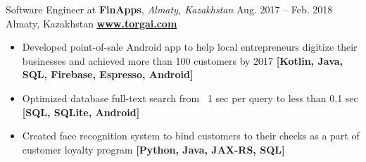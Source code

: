 \cveventflat
{Software Engineer at }
{\textbf{FinApps}, \textit{Almaty, Kazakhstan}}
{Aug. 2017 -- Feb. 2018}
{Almaty, Kazakhstan}
\newline
\href{https://torgai.com/}{\textbf{www.torgai.com}}
\begin{itemize}
    \item Developed point-of-sale Android app to help local entrepreneurs digitize their businesses and achieved more than 100 customers by 2017
    \textbf{[Kotlin, Java, SQL, Firebase, Espresso, Android]}
    \item Optimized database full-text search from ~1 sec per query to less than 0.1 sec
    \textbf{[SQL, SQLite, Android]}
    \item Created face recognition system to bind customers to their checks as a part of customer loyalty program
    \textbf{[Python, Java, JAX-RS, SQL]}
\end{itemize}
